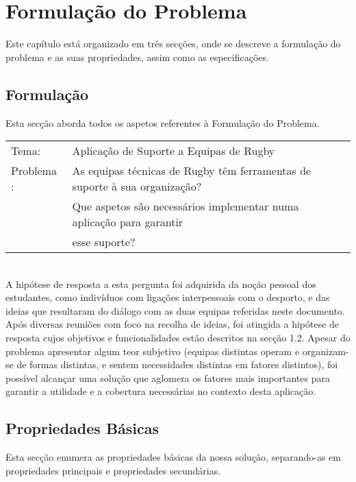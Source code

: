 %
%
%
\chapter{Formulação do Problema} \label{cap:formulacao}

Este capítulo está organizado em três secções, onde se descreve a formulação do problema e as suas propriedades, assim como as especificações.\\

\section{Formulação}\label{sec21}
Esta secção aborda todos os aspetos referentes à Formulação do Problema.\\

\begin{tabular}{ll}
	Tema: & Aplicação de Suporte a Equipas de Rugby \\
	Problema : & As equipas técnicas de Rugby têm ferramentas de suporte à sua organização? \\
		&	Que aspetos são necessários implementar numa aplicação para garantir \\
		&	esse suporte?\\
\end{tabular}\\[10mm]
A hipótese de resposta a esta pergunta foi adquirida da noção pessoal dos estudantes, como indivíduos com ligações interpessoais com o desporto, e das ideias que resultaram do diálogo com as duas equipas referidas neste documento. Após diversas reuniões com foco na recolha de ideias, foi atingida a hipótese de resposta cujos objetivos e funcionalidades estão descritos na secção 1.2. Apesar do problema apresentar algum teor subjetivo (equipas distintas operam e organizam-se de formas distintas, e sentem necessidades distintas em fatores distintos), foi possível alcançar uma solução que aglomera os fatores mais importantes para garantir a utilidade e a cobertura necessárias no contexto desta aplicação.

\section{Propriedades Básicas}\label{sec22}
Esta secção enumera as propriedades básicas da nossa solução, separando-as em propriedades principais e propriedades secundárias.

